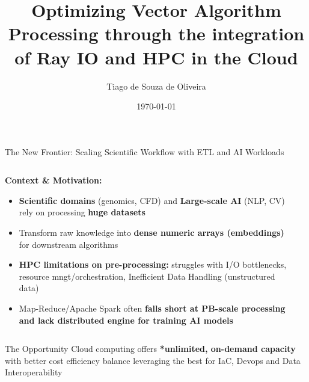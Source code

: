 \documentclass[aspectratio=169]{beamer}
\title[Optimizing Vector Algorithm Processing]{Optimizing Vector Algorithm Processing through the integration of Ray IO and HPC in the Cloud}
\author{Tiago de Souza de Oliveira}
\institute[University]{
    Master's Thesis Defense \\
    Computer Science Department
}
\date{\today}
\begin{document}
\frame{\titlepage}

\begin{frame}{The New Frontier: Scaling Scientific Workflow with ETL and AI Workloads}
    \begin{columns}
        \begin{column}{0.7\textwidth}
            \textbf{Context \& Motivation:}
            \begin{itemize}
                \item \textbf{Scientific domains} (genomics, CFD) and \textbf{Large-scale AI} (NLP, CV) rely on processing \textbf{huge datasets}
                \item Transform raw knowledge into \textcolor{rayblue}{\textbf{dense numeric arrays (embeddings)}} for downstream algorithms
                \item \textbf{HPC limitations on pre-processing:} struggles with I/O bottlenecks, resource mngt/orchestration, Inefficient Data Handling (unstructured data)
                \item Map-Reduce/Apache Spark often \textbf{falls short at PB-scale processing and lack distributed engine for training AI models}
            \end{itemize}
        \end{column}
        \begin{column}{0.3\textwidth}
        \end{column}
    \end{columns}
    
    \vspace{0.3cm}
    \begin{block}{The Opportunity}
        Cloud computing offers \textbf{*unlimited, on-demand capacity} with better cost efficiency balance leveraging the best for IaC, Devops and Data Interoperability
    \end{block}
\end{frame}
\end{document}
